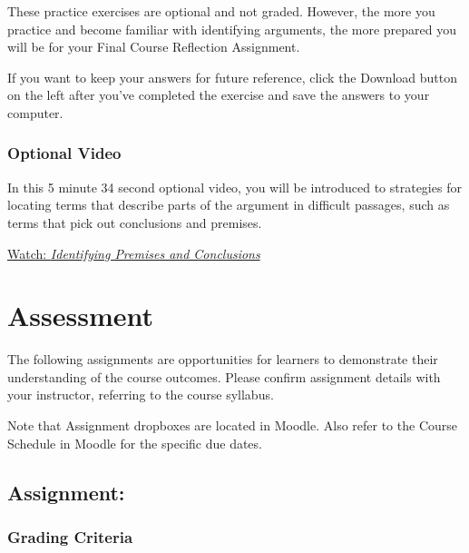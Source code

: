 \documentclass[
]{book}
\begin{document}
\begin{reflect}
These practice exercises are optional and not graded. However, the more you practice and become familiar with identifying arguments, the more prepared you will be for your Final Course Reflection Assignment.

If you want to keep your answers for future reference, click the Download button on the left after you've completed the exercise and save the answers to your computer.
\end{reflect}

\hypertarget{optional-video-11}{%
\subsection*{Optional Video}\label{optional-video-11}}

\begin{reflect}
In this 5 minute 34 second optional video, you will be introduced to strategies for locating terms that describe parts of the argument in difficult passages, such as terms that pick out conclusions and premises.

\href{https://www.youtube.com/watch?v=07mehbgE5jc}{Watch: \emph{Identifying Premises and Conclusions}}
\end{reflect}

\hypertarget{assessment}{%
\chapter*{Assessment}\label{assessment}}

The following assignments are opportunities for learners to demonstrate their understanding of the course outcomes. Please confirm assignment details with your instructor, referring to the course syllabus.

Note that Assignment dropboxes are located in Moodle. Also refer to the Course Schedule in Moodle for the specific due dates.

\hypertarget{assignment}{%
\section*{Assignment:}\label{assignment}}

\hypertarget{grading-criteria}{%
\subsection*{Grading Criteria}\label{grading-criteria}}
\end{document}
